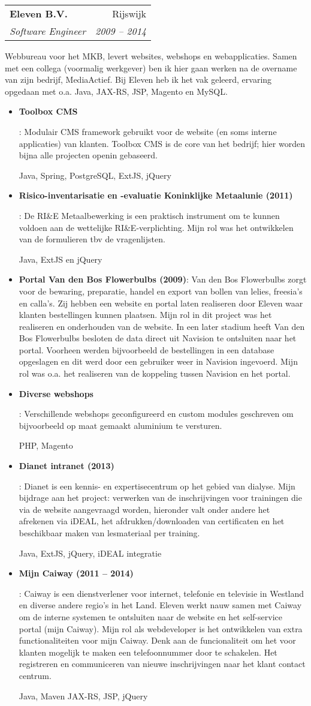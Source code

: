 \documentclass[a4paper,11pt]{article}
\makeatletter
\newcommand{\resumeItem}[2]{
  \item\small{
    \textbf{#1}{: #2 \vspace{-2pt}}
  }
}
\newcommand{\resumeSubheading}[4]{
  \vspace{-1pt}\item
    \begin{tabular*}{0.97\textwidth}[t]{l@{\extracolsep{\fill}}r}
      \textbf{#1} & #2 \\
      \textit{\small#3} & \textit{\small #4} \\
    \end{tabular*}\vspace{-2pt}
}
\newcommand{\resumeItemListStart}{\begin{itemize}}
\newcommand{\resumeItemListEnd}{\end{itemize}\vspace{-5pt}}
\makeatother
\begin{document}
    \resumeSubheading
      {Eleven B.V.}{Rijswijk}
      {Software Engineer}{2009 -- 2014}
	  \par
	  Webbureau voor het MKB, levert websites, webshops en webapplicaties. Samen met een collega 
	  (voormalig werkgever) ben ik hier gaan werken na de overname van zijn bedrijf, MediaActief.
	  Bij Eleven heb ik het vak geleerd, ervaring opgedaan met o.a. Java, JAX-RS, JSP, Magento 
	  en MySQL.
      \resumeItemListStart
        \resumeItem{Toolbox CMS}
          {Modulair CMS framework gebruikt voor de website (en soms interne applicaties) 
		  van klanten. Toolbox CMS is de core van het bedrijf; hier worden bijna alle projecten openin
		  gebaseerd.
		  \par
		  Java, Spring, PostgreSQL, ExtJS, jQuery}
        \resumeItem{Risico-inventarisatie en -evaluatie Koninklijke Metaalunie (2011)}
          {De RI\&E Metaalbewerking is een praktisch instrument om te kunnen voldoen aan
		  de wettelijke RI\&E-verplichting. Mijn rol was het ontwikkelen van de formulieren tbv de
		  vragenlijsten.
		  \par
		  Java, ExtJS en jQuery}
		\resumeItem{Portal Van den Bos Flowerbulbs (2009)}
		  {Van den Bos Flowerbulbs zorgt voor de bewaring, preparatie, handel en export van bollen
		  van lelies, freesia’s en calla’s. Zij hebben een website en portal laten realiseren door
		  Eleven waar klanten bestellingen kunnen plaatsen. Mijn rol in dit project was het realiseren
		  en onderhouden van de website. In een later stadium heeft Van den Bos Flowerbulbs besloten
		  de data direct uit Navision te ontsluiten naar het portal. Voorheen werden bijvoorbeeld de 
		  bestellingen in een database opgeslagen en dit werd door een gebruiker weer in Navision
		  ingevoerd. Mijn rol was o.a. het realiseren van de koppeling tussen Navision en het portal.}
        \resumeItem{Diverse webshops}
          {Verschillende webshops geconfigureerd en custom modules geschreven om bijvoorbeeld op
		  maat gemaakt aluminium te versturen.
		  \par
		  PHP, Magento}
        \resumeItem{Dianet intranet (2013)}
          {Dianet is een kennis- en expertisecentrum op het gebied van dialyse. Mijn bijdrage aan het
		  project: verwerken van de inschrijvingen voor trainingen die via de website aangevraagd 
		  worden, hieronder valt onder andere het afrekenen via iDEAL, het afdrukken/downloaden 
		  van certificaten en het beschikbaar maken van lesmateriaal per training.
		  \par
		  Java, ExtJS, jQuery, iDEAL integratie}
        \resumeItem{Mijn Caiway (2011 -- 2014)}
          {Caiway is een dienstverlener voor internet, telefonie en televisie in Westland en diverse 
		  andere regio’s in het Land. Eleven werkt nauw samen met Caiway om de interne systemen te 
		  ontsluiten naar de website en het self-service portal (mijn Caiway). Mijn rol als 
		  webdeveloper is het ontwikkelen van extra functionaliteiten voor mijn Caiway. Denk aan de 
		  funcionaliteit om het voor klanten mogelijk te maken een telefoonnummer door te schakelen. 
		  Het registreren en communiceren van nieuwe inschrijvingen naar het klant contact centrum.
		  \par
		  Java, Maven JAX-RS, JSP, jQuery}
      \resumeItemListEnd
\end{document}
